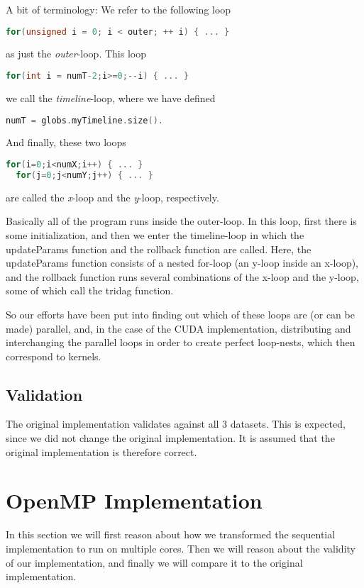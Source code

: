 \documentclass[11pt]{article}
\begin{document}
A bit of terminology: We refer to the following loop
\begin{lstlisting}[language=C]
  for(unsigned i = 0; i < outer; ++ i) { ... }
\end{lstlisting}
as just the \emph{outer}-loop. This loop
\begin{lstlisting}[language=C]
  for(int i = numT-2;i>=0;--i) { ... }
\end{lstlisting}
we call the \emph{timeline}-loop, where we have defined
\begin{lstlisting}[language=C]
  numT = globs.myTimeline.size().
\end{lstlisting}
And finally, these two loops
\begin{lstlisting}[language=C]
  for(i=0;i<numX;i++) { ... }
  for(j=0;j<numY;j++) { ... }
\end{lstlisting}
are called the \emph{x}-loop and the \emph{y}-loop, respectively.

Basically all of the program runs inside the outer-loop.
In this loop, first there is some initialization, and then we enter the timeline-loop in which the updateParams function and the rollback function are called.
Here, the updateParams function consists of a nested for-loop (an y-loop inside an x-loop), and the rollback function runs several combinations of the x-loop and the y-loop, some of which call the tridag function.

So our efforts have been put into finding out which of these loops are (or can be made) parallel, and, in the case of the CUDA implementation, distributing and interchanging the parallel loops in order to create perfect loop-nests, which then correspond to kernels.


\subsection{Validation}
The original implementation validates against all 3 datasets. This is expected,
since we did not change the original implementation. It is assumed that the 
original implementation is therefore correct.


\section{OpenMP Implementation}
In this section we will first reason about how we transformed the sequential
implementation to run on multiple cores. Then we will reason about the validity 
of our implementation, and finally we will compare it to the original 
implementation.
\end{document}
